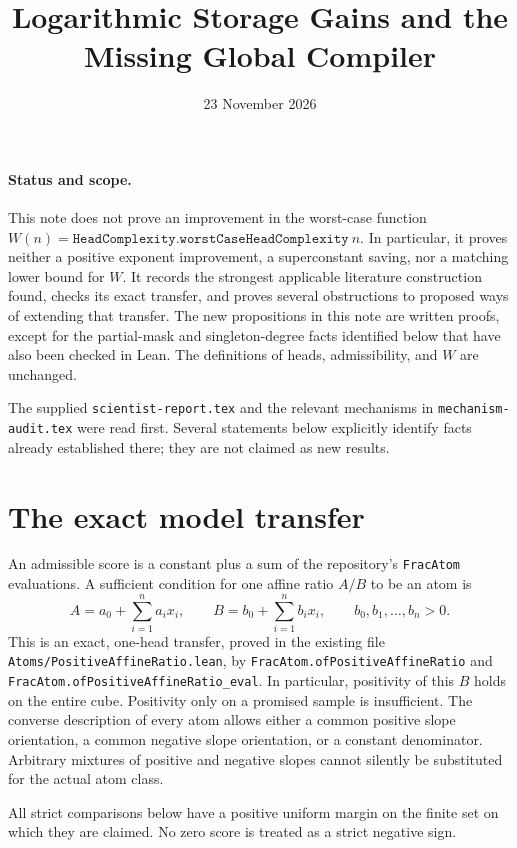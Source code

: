 \documentclass[11pt]{article}
\title{Logarithmic Storage Gains and the Missing Global Compiler}
\author{}
\date{23 November 2026}
\begin{document}
\maketitle

\paragraph{Status and scope.}
This note does not prove an improvement in the worst-case function
$W(n)=\texttt{HeadComplexity.worstCaseHeadComplexity}\ n$.
In particular, it proves neither a positive exponent improvement,
a superconstant saving, nor a matching lower bound for $W$.
It records the strongest applicable literature construction found,
checks its exact transfer, and proves several obstructions to proposed
ways of extending that transfer. The new propositions in this note
are written proofs, except for the partial-mask and singleton-degree
facts identified below that have also been checked in Lean. The definitions of heads,
admissibility, and $W$ are unchanged.

The supplied \texttt{scientist-report.tex} and the relevant mechanisms
in \texttt{mechanism-audit.tex} were read first. Several statements
below explicitly identify facts already established there; they are
not claimed as new results.

\section{The exact model transfer}

An admissible score is a constant plus a sum of the repository's
\texttt{FracAtom} evaluations. A sufficient condition for one affine
ratio $A/B$ to be an atom is
\[
 A=a_0+\sum_{i=1}^n a_ix_i,\qquad
 B=b_0+\sum_{i=1}^n b_ix_i,\qquad b_0,b_1,\ldots,b_n>0.
\]
This is an exact, one-head transfer, proved in the existing file
\texttt{Atoms/PositiveAffineRatio.lean}, by
\texttt{FracAtom.ofPositiveAffineRatio} and
\texttt{FracAtom.ofPositiveAffineRatio\_eval}.
In particular, positivity of this $B$ holds on the entire cube.
Positivity only on a promised sample is insufficient. The converse
description of every atom allows either a common positive slope
orientation, a common negative slope orientation, or a constant
denominator. Arbitrary mixtures of positive and negative slopes
cannot silently be substituted for the actual atom class.

All strict comparisons below have a positive uniform margin on the
finite set on which they are claimed. No zero score is treated as a
strict negative sign.
\end{document}

